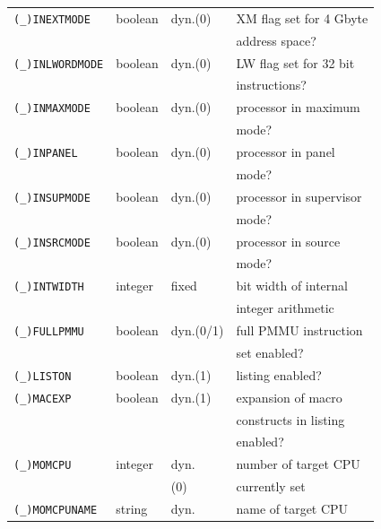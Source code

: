 \documentclass[12pt,twoside]{report}
\newcommand{\predefsym}[1]{{\tt (\_)#1}}
\begin{document}
\begin{center}
\begin{longtable}{|l|l|l|l|}
\hline
\predefsym{INEXTMODE}  & boolean     & dyn.(0)    & XM flag set for 4 Gbyte \\
                       &             &            & address space? \\
\hline
\predefsym{INLWORDMODE} & boolean    & dyn.(0)    & LW flag set for 32 bit \\
                       &             &            & instructions? \\
\hline
\predefsym{INMAXMODE}  & boolean     & dyn.(0)    & processor in maximum \\
                       &             &            & mode? \\
\hline
\predefsym{INPANEL}    & boolean     & dyn.(0)    & processor in panel \\
                       &             &            & mode? \\
\hline
\predefsym{INSUPMODE}  & boolean     & dyn.(0)    & processor in supervisor \\
                       &             &            & mode? \\
\hline
\predefsym{INSRCMODE}  & boolean     & dyn.(0)    & processor in source \\
                       &             &            & mode? \\
\hline
\predefsym{INTWIDTH}   & integer     & fixed      & bit width of internal \\
                       &             &            & integer arithmetic \\
\hline
\predefsym{FULLPMMU}   & boolean     & dyn.(0/1)  & full PMMU instruction \\
                       &             &            & set enabled? \\
\hline
\predefsym{LISTON}     & boolean     & dyn.(1)    & listing enabled? \\
\hline
\predefsym{MACEXP}     & boolean     & dyn.(1)    & expansion of macro \\
                       &             &            & constructs in listing \\
                       &             &            & enabled? \\
\hline
\predefsym{MOMCPU}     & integer     & dyn.       & number of target CPU \\
	               &             & (0)        & currently set \\
\hline
\predefsym{MOMCPUNAME} & string      & dyn.       & name of target CPU \\

\end{longtable}
\end{center}
\end{document}
